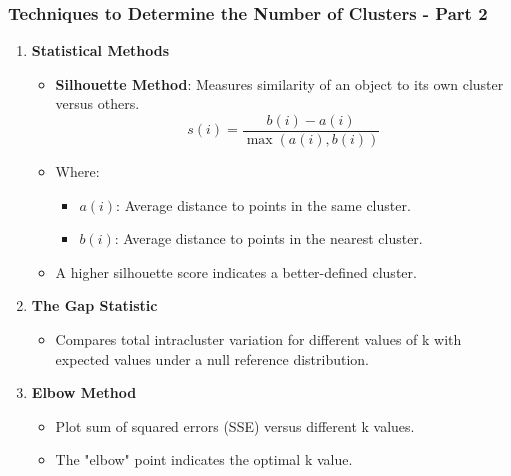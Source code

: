 \documentclass[aspectratio=169]{beamer}
\begin{document}
\begin{frame}[fragile]
    \frametitle{Techniques to Determine the Number of Clusters - Part 2}
    \begin{enumerate}[resume]
        \item \textbf{Statistical Methods}
            \begin{itemize}
                \item \textbf{Silhouette Method}: Measures similarity of an object to its own cluster versus others.
                \begin{equation}
                    s(i) = \frac{b(i) - a(i)}{\max(a(i), b(i))}
                \end{equation}
                \item Where:
                    \begin{itemize}
                        \item \( a(i) \): Average distance to points in the same cluster.
                        \item \( b(i) \): Average distance to points in the nearest cluster.
                    \end{itemize}
                \item A higher silhouette score indicates a better-defined cluster.
            \end{itemize}

        \item \textbf{The Gap Statistic}
            \begin{itemize}
                \item Compares total intracluster variation for different values of k with expected values under a null reference distribution.
            \end{itemize}
        
        \item \textbf{Elbow Method}
            \begin{itemize}
                \item Plot sum of squared errors (SSE) versus different k values.
                \item The "elbow" point indicates the optimal k value.
            \end{itemize}
    \end{enumerate}
\end{frame}
\end{document}
